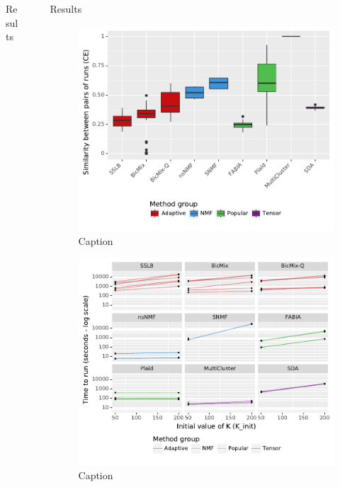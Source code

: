\documentclass[xcolor=table,final]{beamer}
\newlength{\sepwid}
\newlength{\onecolwid}
\begin{document}
\begin{frame}[t]
\begin{columns}[t]
\begin{column}{\onecolwid}
\begin{block}{Results}
\end{block}

\end{column} %

\begin{column}{\sepwid}\end{column} %
\begin{column}{\onecolwid} %


\begin{block}{Results}


\begin{figure}
\includegraphics[width=0.9 \textwidth]{plots/similarity_methods_K.pdf}
\caption{Caption}
\end{figure}

\begin{figure}
\includegraphics[width=0.9 \textwidth]{plots/IMPC_comp_reqs_s_against_K.pdf}
\caption{Caption}
\end{figure}


\end{block}
\end{column}
\end{columns}
\end{frame}
\end{document}
